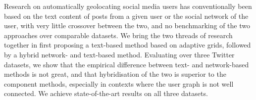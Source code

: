Research on automatically geolocating social media users has conventionally been based on the text content of posts from a given user or the social network of the user, with very little crossover between the two, and no benchmarking of the two approaches over comparable datasets. We bring the two threads of research together in first proposing a text-based method based on adaptive grids, followed by a hybrid network- and text-based method. Evaluating over three Twitter datasets, we show that the empirical difference between text- and network-based methods is not great, and that hybridisation of the two is superior to the component methods, especially in contexts where the user graph is not well connected. We achieve state-of-the-art results on all three datasets.
